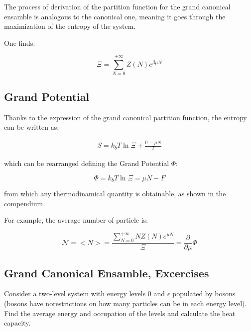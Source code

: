 \documentclass{article}
\begin{document}
The process of derivation of the partition function for the grand canonical ensamble is analogous to the canonical one,
meaning it goes through the maximization of the entropy of the system.

One finds:

\begin{tcolorbox}[colframe=gray!50, colback=gray!10, coltitle=black, title=Grand Canonical Partition Function]
    \begin{equation}
        \Xi= \sum_{N=0}^{+\infty}Z(N)e^{\beta\mu N}
    \end{equation}
\end{tcolorbox}

\subsection{Grand Potential}

Thanks to the expression of the grand canonical partition function, the
entropy can be written as:

\begin{align*}
    S= k_bT\ln{\Xi}+\frac{U-\mu N}{T}
\end{align*}

which can be rearranged defining the Grand Potential $\Phi$:

\begin{tcolorbox}[colframe=gray!50, colback=gray!10, coltitle=black, title=Grand Potential]
    \begin{equation}
        \Phi=k_bT\ln{\Xi}=\mu N-F
    \end{equation}
\end{tcolorbox}

from which any thermodinamical quantity is obtainable, as shown in the compendium.

For example, the average number of particle is:

\begin{equation}
    \mathcal{N}=<N>=\frac{\sum_{N=0}^{+\infty} N Z(N)e^{\mu N}}{\Xi}= \frac{\partial}{\partial \mu}\Phi
\end{equation}

\newpage

\subsection{Grand Canonical Ensamble, Excercises}

\begin{tcolorbox}[colframe=orange!60, colback=gray!5, coltitle=black, title=\textbf{Kennett, 6.4}, fonttitle=\large\bfseries]

    Consider a two-level system with energy levels 0 and $\epsilon$ populated by bosons (bosons
    have norestrictions on how many particles can be in each energy level). Find the
    average energy and occupation of the levels and calculate the heat capacity.

\end{tcolorbox}
\end{document}
